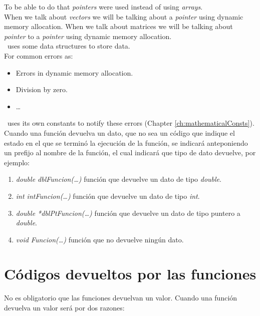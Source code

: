 To be able to do that \emph{pointers} were used instead of using \emph{arrays}.\\

When we talk about \emph{vectors} we will be talking about a \emph{pointer} using dynamic memory allocation. When we talk about matrices we will be talking about \emph{pointer} to a \emph{pointer} using dynamic memory allocation.\\

\BI\ uses some data structures to store data.\\

For common errors as:

\begin{itemize}
\item Errors in dynamic memory allocation.
\item Division by zero.
\item \ldots
\end{itemize}

\BI\ uses its own constants to notify these errors (Chapter \ref{ch:mathematicalConsts}).\\

Cuando una funci\'on devuelva un dato, que no sea un c\'odigo que indique
el estado en el que se termin\'o la ejecuci\'on de la funci\'on, se indicar\'a 
anteponiendo un prefijo al nombre de la funci\'on, el cual indicar\'a que tipo
de dato devuelve, por ejemplo:

\begin{enumerate}
\item \emph{double dblFuncion(\ldots)} funci\'on que devuelve un dato de
      tipo \emph{double}.
\item \emph{int intFuncion(\ldots)} funci\'on que devuelve un dato de tipo
      \emph{int}.
\item \emph{double *dblPtFuncion(\ldots)} funci\'on que devuelve un dato de
      tipo puntero a \emph{double}.
\item \emph{void Funcion(\ldots)} funci\'on que no devuelve ning\'un dato.
\end{enumerate}

\newpage

\section{C\'odigos devueltos por las funciones}

No es obligatorio que las funciones devuelvan un valor.\newline
Cuando una funci\'on devuelva un valor ser\'a por dos razones:

